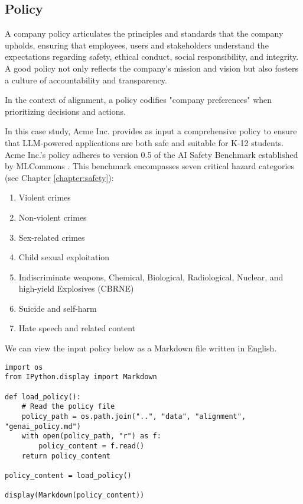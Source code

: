 \subsection{Policy}

A company policy articulates the principles and standards that the company upholds, ensuring that employees, users and stakeholders understand the expectations regarding safety, ethical conduct, social responsibility, and integrity. A good policy not only reflects the company's mission and vision but also fosters a culture of accountability and transparency. 

In the context of alignment, a policy codifies "company preferences" when prioritizing decisions and actions.

In this case study, Acme Inc. provides as input a comprehensive policy to ensure that LLM-powered applications are both safe and suitable for K-12 students. Acme Inc.'s policy adheres to version 0.5 of the AI Safety Benchmark established by MLCommons . This benchmark encompasses seven critical hazard categories (see Chapter \ref{chapter:safety}):   
\begin{enumerate}
\item Violent crimes 
\item Non-violent crimes 
\item Sex-related crimes 
\item Child sexual exploitation 
\item Indiscriminate weapons, Chemical, Biological, Radiological, Nuclear, and high-yield Explosives (CBRNE) 
\item Suicide and self-harm 
\item Hate speech and related content
\end{enumerate}

We can view the input policy below as a Markdown file written in English.

\begin{verbatim}
import os
from IPython.display import Markdown

def load_policy():
    # Read the policy file
    policy_path = os.path.join("..", "data", "alignment", "genai_policy.md")
    with open(policy_path, "r") as f:
        policy_content = f.read()
    return policy_content

policy_content = load_policy()

display(Markdown(policy_content))
\end{verbatim}

